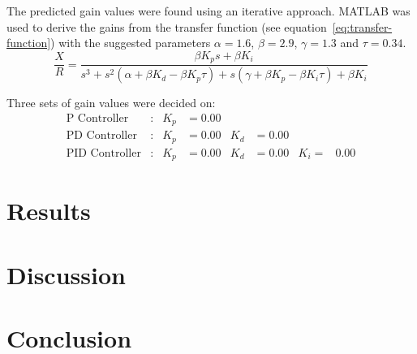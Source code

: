 \documentclass[12pt]{article} %
\begin{document}
\noindent The predicted gain values were found using an iterative approach.
MATLAB was used to derive the gains from the transfer function (see equation\ \ref{eq:transfer-function}) with the suggested parameters $\alpha = 1.6$, $\beta = 2.9$, $\gamma = 1.3$ and $\tau = 0.34$.
\begin{equation}
\label{eq:transfer-function}
\frac{X}{R} = \frac{\beta K_p s + \beta K_i}{s^3 + s^2 (\alpha + \beta K_d - \beta K_p \tau) + s(\gamma + \beta K_p - \beta K_i \tau) + \beta K_i}
\end{equation}

\noindent Three sets of gain values were decided on:
\begin{align*}
\textrm{P Controller} &: & K_p &= 0.00 & & & \\
\textrm{PD Controller} &: & K_p &= 0.00 & K_d &= 0.00 & & \\
\textrm{PID Controller} &: & K_p &= 0.00 & K_d &= 0.00 & K_i = &0.00
\end{align*}


\newpage

\section{Results}


\blindtext

\blindtext

\blindtext

\newpage

\section{Discussion}


\blindtext

\blindtext

\blindtext

\newpage

\section{Conclusion}


\blindtext

\blindtext

\blindtext
\end{document}
